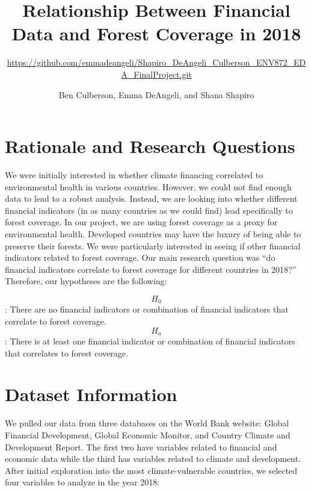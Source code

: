 \documentclass[
  12pt,
]{article}
\title{Relationship Between Financial Data and Forest Coverage in 2018}
\subtitle{\url{https://github.com/emmadeangeli/Shapiro_DeAngeli_Culberson_ENV872_EDA_FinalProject.git}}
\author{Ben Culberson, Emma DeAngeli, and Shana Shapiro}
\date{}
\begin{document}
\maketitle

\newpage
\tableofcontents 
\newpage
\listoftables
\newpage
\listoffigures 
\newpage

\hypertarget{rationale-and-research-questions}{%
\section{Rationale and Research
Questions}\label{rationale-and-research-questions}}

We were initially interested in whether climate financing correlated to
environmental health in various countries. However, we could not find
enough data to lead to a robust analysis. Instead, we are looking into
whether different financial indicators (in as many countries as we could
find) lead specifically to forest coverage. In our project, we are using
forest coverage as a proxy for environmental health. Developed countries
may have the luxury of being able to preserve their forests. We were
particularly interested in seeing if other financial indicators related
to forest coverage. Our main research question was ``do financial
indicators correlate to forest coverage for different countries in
2018?'' Therefore, our hypotheses are the following:

\[H_0\]: There are no financial indicators or combination of financial
indicators that correlate to forest coverage. \[H_a\]: There is at least
one financial indicator or combination of financial indicators that
correlates to forest coverage.

\newpage

\hypertarget{dataset-information}{%
\section{Dataset Information}\label{dataset-information}}

We pulled our data from three databases on the World Bank website:
Global Financial Development, Global Economic Monitor, and Country
Climate and Development Report. The first two have variables related to
financial and economic data while the third has variables related to
climate and development. After initial exploration into the most
climate-vulnerable countries, we selected four variables to analyze in
the year 2018:
\end{document}
